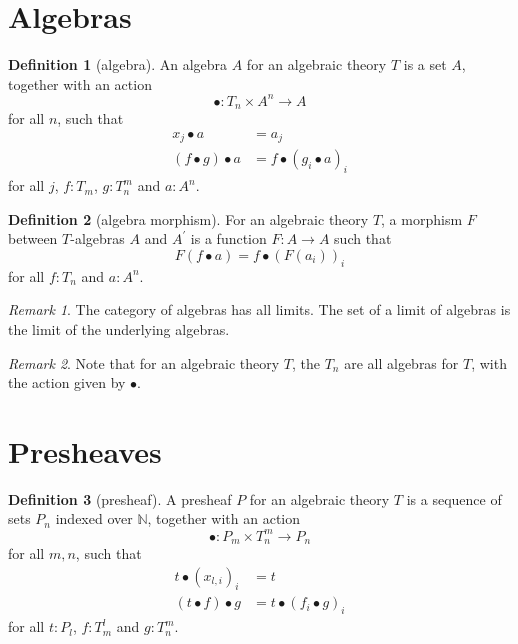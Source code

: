 \documentclass[a4paper]{amsbook}
\theoremstyle{definition}
\newtheorem{definition}{Definition}
\theoremstyle{remark}
\newtheorem{remark}{Remark}
\begin{document}
  \section{Algebras}

  \begin{definition}[algebra]
    An algebra $ A $ for an algebraic theory $ T $ is a set $ A $, together with an action
    \[ \bullet: T_n \times A^n \to A \]
    for all $ n $, such that
    \begin{align*}
      x_j \bullet a &= a_j\\
      (f \bullet g) \bullet a &= f \bullet (g_i \bullet a)_i
    \end{align*}
    for all $ j $, $ f: T_m $, $ g: T_n^m $ and $ a: A^n $.
  \end{definition}

  \begin{definition}[algebra morphism]
    For an algebraic theory $ T $, a morphism $ F $ between $ T $-algebras $ A $ and $ A^\prime $ is a function $ F: A \to A $ such that
    \[ F(f \bullet a) = f \bullet (F(a_i))_i \]
    for all $ f: T_n $ and $ a: A^n $.
  \end{definition}

  \begin{remark}
    The category of algebras has all limits. The set of a limit of algebras is the limit of the underlying algebras.
  \end{remark}

  \begin{remark}
    Note that for an algebraic theory $ T $, the $ T_n $ are all algebras for $ T $, with the action given by $ \bullet $.
  \end{remark}

  \section{Presheaves}

  \begin{definition}[presheaf]
    A presheaf $ P $ for an algebraic theory $ T $ is a sequence of sets $ P_n $ indexed over $ \mathbb N $, together with an action
    \[ \bullet: P_m \times T_n^m \to P_n \]
    for all $ m, n $, such that
    \begin{align*}
      t \bullet (x_{l, i})_i &= t\\
      (t \bullet f) \bullet g &= t \bullet (f_i \bullet g)_i
    \end{align*}
    for all $ t: P_l $, $ f: T_m^l $ and $ g: T_n^m $.
  \end{definition}
\end{document}
